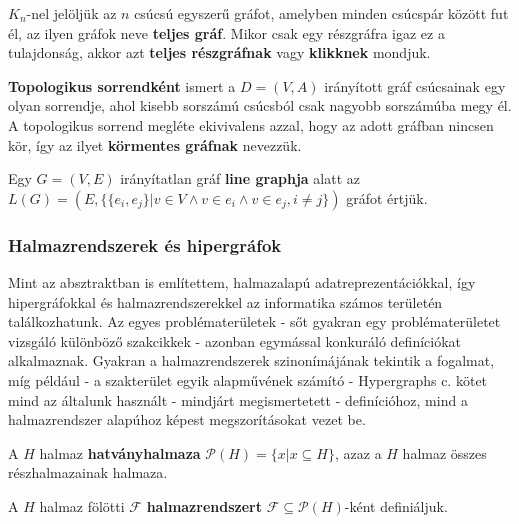 \begin{definition}
$K_n$-nel jelöljük az $n$ csúcsú egyszerű gráfot, amelyben minden csúcspár között fut él, az ilyen gráfok neve \textbf{teljes gráf}. Mikor csak egy részgráfra igaz ez a tulajdonság, akkor azt \textbf{teljes részgráfnak} vagy \textbf{klikknek} mondjuk.
\end{definition}


\begin{definition}
\textbf{Topologikus sorrendként} ismert a $D=(V,A)$ irányított gráf csúcsainak egy olyan sorrendje, ahol kisebb sorszámú csúcsból csak nagyobb sorszámúba megy él. A topologikus sorrend megléte ekivivalens azzal, hogy az adott gráfban nincsen kör, így az ilyet \textbf{körmentes gráfnak} nevezzük.
\end{definition}

\begin{definition}
Egy $G=(V,E)$ irányítatlan gráf \textbf{line graphja} alatt az $L(G)=(E, \{ \{ e_i, e_j \} | v \in V \land v \in e_i \land v \in e_j, i \neq j \})$ gráfot értjük.
\end{definition}

\subsubsection{Halmazrendszerek és hipergráfok}

Mint az absztraktban is említettem, halmazalapú adatreprezentációkkal, így hipergráfokkal és halmazrendszerekkel az informatika számos területén találkozhatunk. Az egyes problématerületek - sőt gyakran egy problématerületet vizsgáló különböző szakcikkek - azonban egymással konkuráló definíciókat alkalmaznak. Gyakran a halmazrendszerek szinonímájának tekintik a fogalmat, míg például - a szakterület egyik alapművének számító - Hypergraphs c. \cite{berge_hypergraphs_book} kötet mind az általunk használt - mindjárt megismertetett - definícióhoz, mind a halmazrendszer alapúhoz képest megszorításokat vezet be.

\begin{definition}
A $H$ halmaz \textbf{hatványhalmaza} $\mathcal{P}(H) = \{x | x \subseteq H\}$, azaz a $H$ halmaz összes részhalmazainak halmaza.
\end{definition}

\begin{definition}
A $H$ halmaz fölötti $\mathcal{F}$ \textbf{halmazrendszert} $\mathcal{F} \subseteq \mathcal{P}(H)$-ként definiáljuk.
\end{definition}

